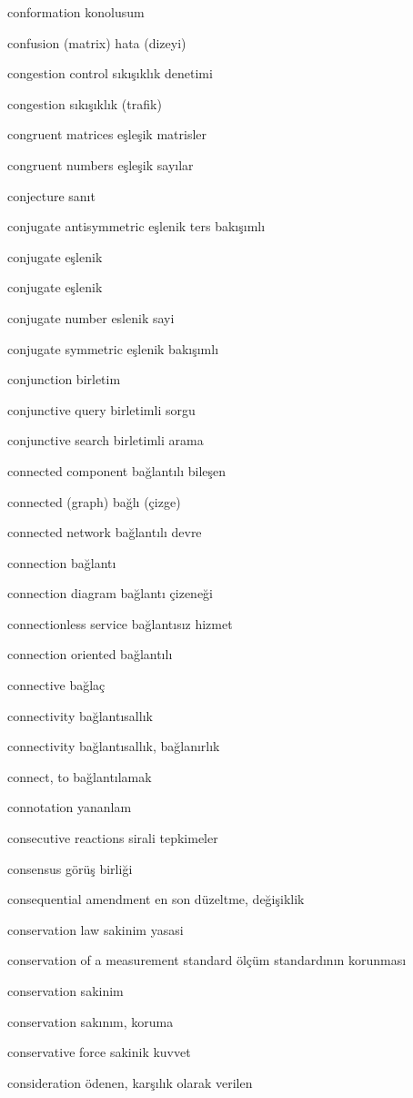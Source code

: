 \documentclass[12pt,fleqn]{article}\usepackage{../../common}
\begin{document}
conformation konolusum

confusion (matrix) hata (dizeyi)

congestion control sıkışıklık denetimi

congestion sıkışıklık (trafik)

congruent matrices eşleşik matrisler

congruent numbers eşleşik sayılar

conjecture sanıt

conjugate antisymmetric eşlenik ters bakışımlı

conjugate eşlenik

conjugate eşlenik

conjugate number eslenik sayi

conjugate symmetric eşlenik bakışımlı

conjunction birletim

conjunctive query birletimli sorgu

conjunctive search birletimli arama

connected component bağlantılı bileşen

connected (graph) bağlı (çizge)

connected network bağlantılı devre

connection bağlantı

connection diagram bağlantı çizeneği

connectionless service bağlantısız hizmet

connection oriented bağlantılı

connective bağlaç

connectivity bağlantısallık

connectivity bağlantısallık, bağlanırlık

connect, to bağlantılamak

connotation yananlam

consecutive reactions sirali tepkimeler

consensus görüş birliği

consequential amendment en son düzeltme, değişiklik

conservation law sakinim yasasi

conservation of a measurement standard ölçüm standardının korunması

conservation sakinim

conservation sakınım, koruma

conservative force sakinik kuvvet

consideration ödenen, karşılık olarak verilen
\end{document}
